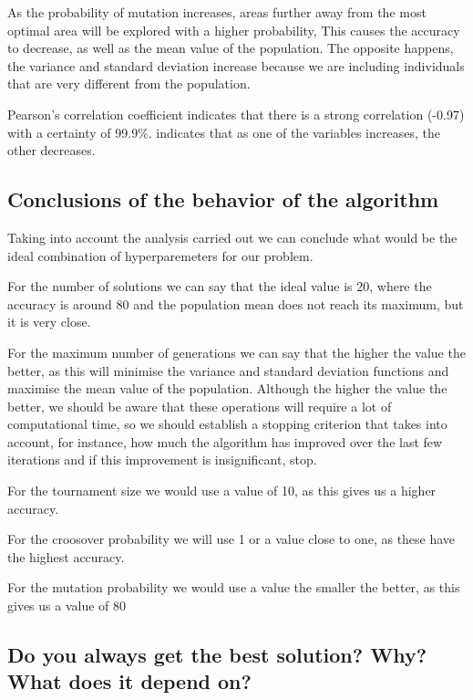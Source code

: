 \documentclass{article}
\begin{document}
    As the probability of mutation increases, areas further away from the most optimal area will be explored with a higher probability,
    This causes the accuracy to decrease, as well as the mean value of the population.
    The opposite happens, the variance and standard deviation increase because we are including individuals that are very different from the population.

    Pearson's correlation coefficient indicates that there is a strong correlation (-0.97) with a certainty of 99.9\%.
    indicates that as one of the variables increases, the other decreases.
        
    \subsection{Conclusions of the behavior of the algorithm}

    Taking into account the analysis carried out we can conclude what would be the ideal combination of hyperparemeters for our problem.

    For the number of solutions we can say that the ideal value is 20, where the accuracy is around 80%
    and the population mean does not reach its maximum, but it is very close.

    For the maximum number of generations we can say that the higher the value the better, as this will minimise the variance and standard deviation functions and maximise the mean value of the population. 
    Although the higher the value the better, we should be aware that these operations will require a lot of computational time, so we should establish a stopping criterion
    that takes into account, for instance, how much the algorithm has improved over the last few iterations and if this improvement is insignificant, stop.

    For the tournament size we would use a value of 10, as this gives us a higher accuracy.
    
    For the croosover probability we will use 1 or a value close to one, as these have the highest accuracy.

    For the mutation probability we would use a value the smaller the better, as this gives us a value of 80%


    \subsection{Do you always get the best solution? Why? What does it depend on?}
\end{document}
